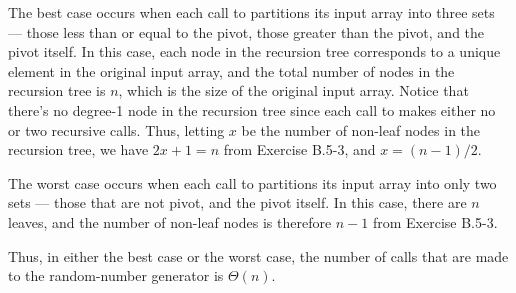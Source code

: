 \documentclass[a4paper, fleqn]{article}
\begin{document}
The best case occurs when each call to  partitions 
its input array into three sets --- those less than or equal to the pivot, 
those greater than the pivot, and the pivot itself. In this case, each node in 
the recursion tree corresponds to a unique element in the original input array, 
and the total number of nodes in the recursion tree is $n$, which is the size 
of the original input array. Notice that there's no degree-1 node in the 
recursion tree since each call to  makes either no 
or two recursive calls. Thus, letting $x$ be the number of non-leaf nodes in 
the recursion tree, we have $2x + 1 = n$ from Exercise B.5-3, and $x = (n - 1) 
/ 2$.

The worst case occurs when each call to  partitions 
its input array into only two sets --- those that are not pivot, and the pivot 
itself. In this case, there are $n$ leaves, and the number of non-leaf nodes is 
therefore $n - 1$ from Exercise B.5-3.

Thus, in either the best case or the worst case, the number of calls that are 
made to the random-number generator  is $\Theta(n)$.
\end{document}
